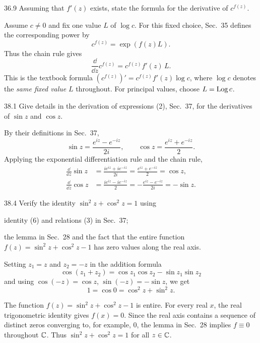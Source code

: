 \documentclass[11pt,oneside]{article}
\begin{document}
\begin{exercise}{36.9}
Assuming that \(f'(z)\) exists, state the formula for the derivative of \(c^{f(z)}\).
\end{exercise}

\begin{solution}
Assume \(c\ne0\) and fix one value \(L\) of \(\log c\). For this fixed choice, Sec.~35 defines the corresponding power by
\[
    c^{f(z)}=\exp(f(z)L).
\]
Thus the chain rule gives
\[
    \boxed{\frac{\dd}{\dd z}c^{f(z)}
    =c^{f(z)}f'(z)\,L}.
\]
This is the textbook formula \((c^{f(z)})'=c^{f(z)}f'(z)\log c\), where \(\log c\) denotes the \emph{same fixed value} \(L\) throughout. For principal values, choose \(L=\operatorname{Log} c\).
\end{solution}

\begin{exercise}{38.1}
Give details in the derivation of expressions (2), Sec.~37, for the derivatives of \(\sin z\) and \(\cos z\).
\end{exercise}

\begin{solution}
By their definitions in Sec.~37,
\[
    \sin z=\frac{e^{iz}-e^{-iz}}{2i},
    \qquad
    \cos z=\frac{e^{iz}+e^{-iz}}2.
\]
Applying the exponential differentiation rule and the chain rule,
\[
\begin{aligned}
    \frac{\dd}{\dd z}\sin z
    &=\frac{ie^{iz}+ie^{-iz}}{2i}
      =\frac{e^{iz}+e^{-iz}}2
      =\boxed{\cos z}, \\
    \frac{\dd}{\dd z}\cos z
    &=\frac{ie^{iz}-ie^{-iz}}2
      =-\frac{e^{iz}-e^{-iz}}{2i}
      =\boxed{-\sin z}.
\end{aligned}
\]
\end{solution}

\begin{exercise}{38.4}
Verify the identity \(\sin^2z+\cos^2z=1\) using
\begin{exercisesubparts}
    \item identity (6) and relations (3) in Sec.~37;
    \item the lemma in Sec.~28 and the fact that the entire function
    \(f(z)=\sin^2z+\cos^2z-1\) has zero values along the real axis.
\end{exercisesubparts}
\end{exercise}

\begin{solution}
\begin{exercisesubparts}
    \item Setting \(z_1=z\) and \(z_2=-z\) in the addition formula
    \[
        \cos(z_1+z_2)=\cos z_1\cos z_2-\sin z_1\sin z_2
    \]
    and using \(\cos(-z)=\cos z\), \(\sin(-z)=-\sin z\), we get
    \[
        1=\cos0=\cos^2z+\sin^2z.
    \]
    \item The function \(f(z)=\sin^2z+\cos^2z-1\) is entire. For every real \(x\), the real trigonometric identity gives \(f(x)=0\). Since the real axis contains a sequence of distinct zeros converging to, for example, \(0\), the lemma in Sec.~28 implies \(f\equiv0\) throughout \(\mathbb{C}\). Thus \(\sin^2z+\cos^2z=1\) for all \(z\in\mathbb{C}\).
\end{exercisesubparts}
\end{solution}
\end{document}
